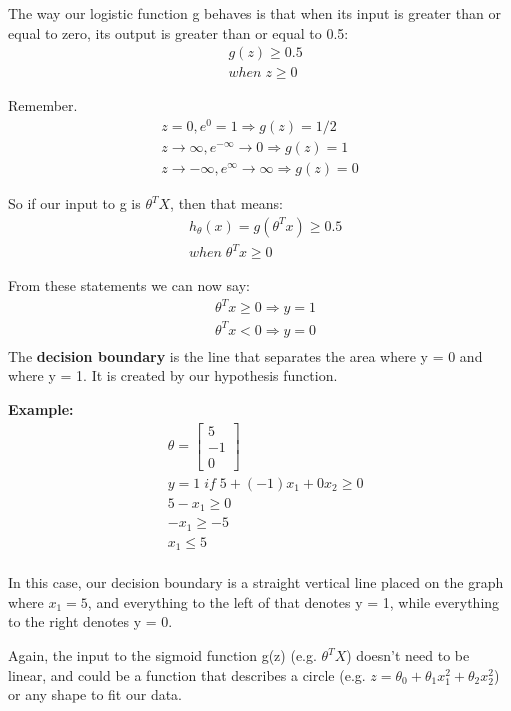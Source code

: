 \documentclass{article}
\begin{document}
The way our logistic function g behaves is that when its input is greater than or equal to zero, its output is greater than or equal to 0.5:
\begin{align*}
	& g(z) \geq 0.5 \\
	& when \; z \geq 0
\end{align*}

Remember.
\begin{align*}
	z=0, e^{0}=1 \Rightarrow g(z)=1/2\\ 
	z \to \infty, e^{-\infty} \to 0 \Rightarrow g(z)=1 \\ 
	z \to -\infty, e^{\infty}\to \infty \Rightarrow g(z)=0 
\end{align*}

So if our input to g is $\theta^T X$, then that means:
\begin{align*}
	& h_\theta(x) = g(\theta^T x) \geq 0.5 \\
	& when \; \theta^T x \geq 0
\end{align*}

From these statements we can now say:
\begin{align*}
	& \theta^T x \geq 0 \Rightarrow y = 1 \\
	& \theta^T x < 0 \Rightarrow y = 0 \\
\end{align*}
The \textbf{decision boundary} is the line that separates the area where y = 0 and where y = 1. It is created by our hypothesis function.

\textbf{Example:}
\begin{align*}
	& \theta = \begin{bmatrix}5 \\ -1 \\ 0\end{bmatrix} \\ 
	& y = 1 \; if \; 5 + (-1) x_1 + 0 x_2 \geq 0 \\ 
	& 5 - x_1 \geq 0 \\ & - x_1 \geq -5 \\
	& x_1 \leq 5 \\ 
\end{align*}

In this case, our decision boundary is a straight vertical line placed on the graph where $x_1 = 5$, and everything to the left of that denotes y = 1, while everything to the right denotes y = 0.

Again, the input to the sigmoid function g(z) (e.g. $\theta^T X$) doesn't need to be linear, and could be a function that describes a circle (e.g. $z = \theta_0 + \theta_1 x_1^2 +\theta_2 x_2^2$) or any shape to fit our data.
\end{document}
